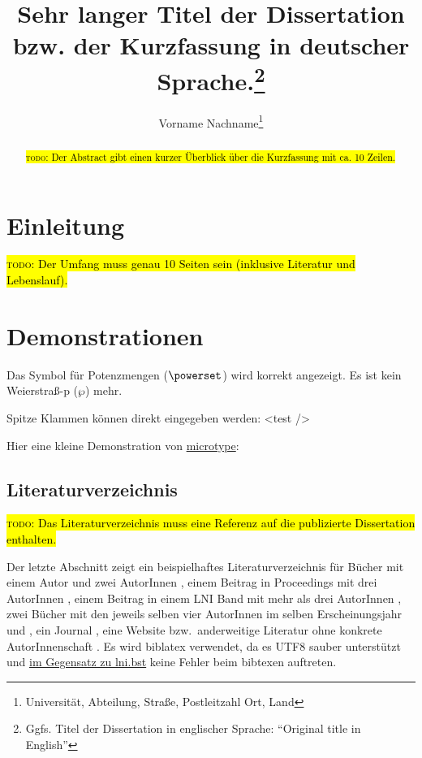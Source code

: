 \documentclass[utf8,biblatex,norunningheads]{lni}
\newcommand{\todo}[1]{\hl{\textsc{todo}: #1}}
\begin{document}
\title{Sehr langer Titel der Dissertation bzw. der Kurzfassung in
  deutscher Sprache.\footnote{Ggfs. Titel der Dissertation in englischer
    Sprache: ``Original title in English''}}
\author[Vorname Nachname]
{Vorname Nachname\footnote{Universität, Abteilung, Straße, Postleitzahl Ort, Land }}

\maketitle

\begin{abstract}
  \todo{
    Der Abstract gibt einen kurzer Überblick über die Kurzfassung mit
    ca. 10 Zeilen.} \blindtext
\end{abstract}

\section{Einleitung}

\todo{Der Umfang muss genau 10 Seiten sein (inklusive Literatur und Lebenslauf).}

\blindtext

\section{Demonstrationen}
\label{sec:demos}
Das Symbol für Potenzmengen ($\powerset$) wird korrekt angezeigt.
Es ist kein Weierstraß-p ($\wp$) mehr.

Spitze Klammen können direkt eingegeben werden: <test />

Hier eine kleine Demonstration von \href{https://www.ctan.org/pkg/microtype}{microtype}:
\blindtext

\subsection{Literaturverzeichnis}

\todo{Das Literaturverzeichnis muss eine Referenz auf die publizierte
Dissertation \mbox{\cite{MeineDiss}} enthalten.}

Der letzte Abschnitt zeigt ein beispielhaftes Literaturverzeichnis für Bücher mit einem Autor \cite{Ez10} und zwei AutorInnen \cite{AB00}, einem Beitrag in Proceedings mit drei AutorInnen \cite{ABC01}, einem Beitrag in einem LNI Band mit mehr als drei AutorInnen \cite{Az09}, zwei Bücher mit den jeweils selben vier AutorInnen im selben Erscheinungsjahr \cite{Wa14} und \cite{Wa14b}, ein Journal \cite{Gl06}, eine Website \cite{GI19} bzw.\ anderweitige Literatur ohne konkrete AutorInnenschaft \cite{XX14}.
Es wird biblatex verwendet, da es UTF8 sauber unterstützt und \href{https://github.com/gi-ev/LNI/issues/5}{im Gegensatz zu lni.bst} keine Fehler beim bibtexen auftreten.
\end{document}
